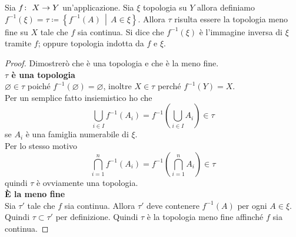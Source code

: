 \begin{theorem}
	Sia $f \colon\ X \rightarrow Y$ un'applicazione. Sia $\xi$ topologia su $Y$ allora definiamo $f^{-1}(\xi) = \tau \coloneqq \left\{f^{-1}(A) \,\middle|\, A \in \xi \right\}$. Allora $\tau$ risulta essere la topologia meno fine su $X$ tale che $f$ sia continua. Si dice che $f^{-1}(\xi)$ è l'immagine inversa di $\xi$ tramite $f$; oppure topologia indotta da $f$ e $\xi$.
\end{theorem}
\begin{proof}
	Dimostrerò che è una topologia e che è la meno fine.\\
	
	\textbf{$\tau$ è una topologia}\\
	
	$\varnothing \in \tau$ poiché $f^{-1}(\varnothing) = \varnothing$, inoltre $X \in \tau$ perché $f^{-1}(Y) = X$. \\
	Per un semplice fatto insiemistico ho che 
	\begin{equation*}
		\bigcup_{i \in I} f^{-1}(A_i) = f^{-1}\left(\bigcup_{i \in I} A_i\right) \in \tau 
	\end{equation*}
	se $A_i$ è una famiglia numerabile di $\xi$.\\
	Per lo stesso motivo
	\begin{equation*}
			\bigcap^n_{i=1} f^{-1}(A_i) = f^{-1}\left(\bigcap^{n}_{i=1} A_i\right) \in \tau
	\end{equation*}
	quindi $\tau$ è ovviamente una topologia.\\
	
	\textbf{È la meno fine}\\
	
	Sia $\tau'$ tale che $f$ sia continua. Allora $\tau'$ deve contenere $f^{-1}(A)$ per ogni $A\in \xi$. Quindi $\tau \subset \tau'$ per definizione. Quindi $\tau$ è la topologia meno fine affinché $f$ sia continua.
\end{proof}

